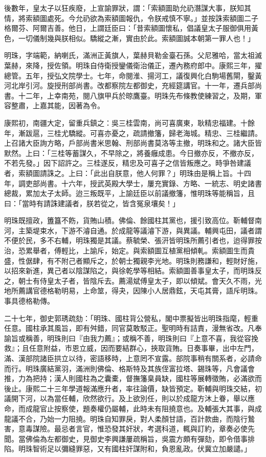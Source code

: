 \begin{pinyinscope}
後數年，皇太子以狂疾廢，上宣諭罪狀，謂：「索額圖助允礽潛謀大事，朕知其情，將索額圖處死。今允礽欲為索額圖報仇，令朕戒慎不寧。」並按誅索額圖二子格爾芬、阿爾吉善。他日，上謂廷臣曰：「昔索額圖懷私，倡議皇太子服御俱用黃色，一切儀制幾與朕相似。驕縱之漸，實由於此。索額圖誠本朝第一罪人也！」

明珠，字端範，納喇氏，滿洲正黃旗人，葉赫貝勒金臺石孫。父尼雅哈，當太祖滅葉赫，來降，授佐領。明珠自侍衛授鑾儀衛治儀正，遷內務府郎中。康熙三年，擢總管。五年，授弘文院學士。七年，命閱淮、揚河工，議復興化白駒場舊閘，鑿黃河北岸引河。旋授刑部尚書。改都察院左都御史，充經筵講官。十一年，遷兵部尚書。十二年，上幸南苑，閱八旗甲兵於晾鷹臺。明珠先布條教使練習之，及期，軍容整肅，上嘉其能，因著為令。

康熙初，南疆大定，留重兵鎮之：吳三桂雲南，尚可喜廣東，耿精忠福建。十餘年，漸跋扈，三桂尤驕縱。可喜亦憂之，疏請撤籓，歸老海城。精忠、三桂繼請。上召諸大臣詢方略，戶部尚書米思翰、刑部尚書莫洛等主撤，明珠和之。諸大臣皆默然。上曰：「三桂等蓄謀久，不早除之，將養癰成患。今日撤亦反，不撤亦反，不若先發。」因下詔許之。三桂遂反，精忠及可喜子之信皆叛應之。時爭咎建議者，索額圖請誅之。上曰：「此出自朕意，他人何罪？」明珠由是稱上旨。十四年，調吏部尚書。十六年，授武英殿大學士，屢充實錄、方略、一統志、明史諸書總裁，累加太子太師。迨三叛既平，上諭廷臣以前議撤籓，惟明珠等能稱旨，且曰：「當時有請誅建議者，朕若從之，皆含冤泉壤矣！」

明珠既擅政，簠簋不飭，貨賄山積。佛倫、餘國柱其黨也，援引致高位。靳輔督南河，主築堤束水，下游不濬自通。於成龍等議濬下游，與異議。輔興屯田，議者謂不便於民，多不右輔，明珠獨是其議。蔡毓榮、張汧皆明珠所薦引者也，迨得罪按治，恐累舉者，傅輕比，上諭斥，始定。與索額圖互植黨相傾軋。索額圖生而貴盛，性倨肆，有不附己者顯斥之，於朝士獨親李光地。明珠則務謙和，輕財好施，以招來新進，異己者以陰謀陷之，與徐乾學等相結。索額圖善事皇太子，而明珠反之，朝士有侍皇太子者，皆陰斥去。薦湯斌傅皇太子，即以傾斌。會天久不雨，光地所薦講官德格勒明易，上命筮，得夬，因陳小人居鼎鉉，天屯其膏，語斥明珠。事具德格勒傳。

二十七年，御史郭琇疏劾：「明珠、國柱背公營私，閣中票擬皆出明珠指麾，輕重任意。國柱承其風旨，即有舛錯，同官莫敢駁正。聖明時有詰責，漫無省改。凡奉諭旨或稱善，明珠則曰『由我力薦』；或稱不善，明珠則曰『上意不喜，我從容挽救』；且任意附益，市恩立威，因而要結群心，挾取貨賄。日奏事畢，出中左門，滿、漢部院諸臣拱立以待，密語移時，上意罔不宣露。部院事稍有關系者，必請命而行。明珠廣結黨羽，滿洲則佛倫、格斯特及其族侄富拉塔、錫珠等，凡會議會推，力為把持；漢人則國柱為之囊橐，督撫籓臬員缺，國柱等展轉徵賄，必滿欲而後止。康熙二十三年學道報滿應升者，率往論價，缺皆預定。靳輔與明珠交結，初議開下河，以為當任輔，欣然欲行。及上欲別任，則以於成龍方沐上眷，舉以應命，而成龍官止按察使，題奏權仍屬輔，此時未有阻撓意也。及輔張大其事，與成龍議不合，乃始一力阻撓。明珠自知罪戾，對人柔顏甘語，百計款曲，而陰行鷙害，意毒謀險。最忌者言官，惟恐發其奸狀，考選科道，輒與訂約，章奏必使先聞。當佛倫為左都御史，見御史李興謙屢疏稱旨，吳震方頗有彈劾，即令借事排陷。明珠智術足以彌縫罪惡，又有國柱奸謀附和，負恩亂政。伏冀立加嚴譴。」


\end{pinyinscope}
